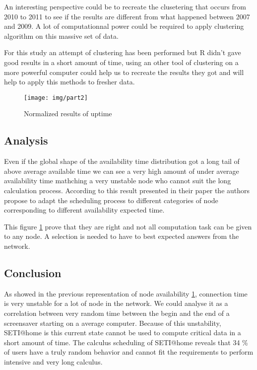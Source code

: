An interesting perspective could be to recreate the clusetering that occurs from 2010 to 2011 to see if
the results are different from what happened between 2007 and 2009. A lot of computationnal power could be 
required to apply clustering algorithm on this massive set of data.

For this study an attempt of clustering has been performed but R didn't gave good results in a short amount
of time, using an other tool of clustering on a more powerful computer could help us to recreate 
the results they got and will
help to apply this methods to fresher data.

\begin{figure}[h]
\begin{center}
\texttt{[image: img/part2]}
\end{center}
\caption{Normalized results of uptime}
\label{part2}
\end{figure}

\subsection{Analysis}

Even if the global shape of the availability time distribution got a long tail of above average
available time we can see a very high amount of under average availability time mathching a very
unstable node who cannot suit the long calculation process. According to this result presented 
in their paper \cite{ja_ko_mascots09} the authors propose to adapt the scheduling process to
different categories of node corresponding to different availability expected time.

This figure \ref{part2} prove that they are right and not all computation task can be 
given to any node. A selection is needed to have to best expected answers from the network.

\subsection{Conclusion}

As showed in the previous representation of node availability \ref{part2}, connection time
is very unstable for a lot of node in the network. We could analyse it as a correlation between
very random time between the begin and the end of a screensaver starting on a average computer.
Because of this unstability, SETI@home is this current state cannot be used to compute critical
data in a short amount of time. The calculus scheduling of SETI@home reveals that 34 \% of users
have a truly random behavior and cannot fit the requirements to perform intensive and very long
calculus.

